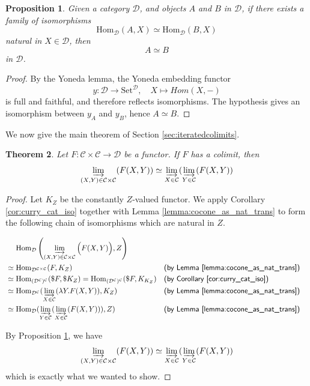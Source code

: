 \documentclass{msthesis}
\newtheorem{theorem}{Theorem}[section]
\newtheorem{prop}[theorem]{Proposition}
\theoremstyle{definition}
\newcommand{\mcC}{\mathcal{C}}
\newcommand{\mcD}{\mathcal{D}}
\newcommand{\Set}{\ensuremath{\mathrm{Set}}}
\newcommand{\colim}{\varinjlim}
\newcommand{\Hom}{\mathrm{Hom}}
\begin{document}
\begin{prop}\label{prop:yoneda_iso}
    Given a category $\mcD$, and objects $A$ and $B$ in $\mcD$, if there exists a family of isomorphisms
    \[ \Hom_\mcD(A, X) \simeq \Hom_\mcD(B, X) \]
    natural in $X \in \mcD$, then
    \[ A \simeq B\]
    in $\mcD$.
\end{prop}

\begin{proof}
    By the Yoneda lemma, the Yoneda embedding functor
    \[ y : \mcD \to \Set^\mcD,\quad X \mapsto Hom(X, -)\]
    is full and faithful, and therefore reflects isomorphisms.
    The hypothesis gives an isomorphism between $y_A$ and $y_B$, hence $A \simeq B$.
\end{proof}

We now give the main theorem of Section \ref{sec:iteratedcolimits}.

\begin{theorem}\label{thm:iterated_colimits}
    Let $F : \mcC \times \mcC \to \mcD$ be a functor. If $F$ has a colimit, then
    \[ \colim_{(X, Y) \in \mcC \times \mcC}(F(X, Y)) \simeq \colim_{X \in \mcC}(\colim_{Y \in \mcC}(F(X,Y)) \]
\end{theorem}
\begin{proof}
    Let $K_Z$ be the constantly $Z$-valued functor.  We apply Corollary \ref{cor:curry_cat_iso} together with Lemma \ref{lemma:cocone_as_nat_trans} to form the following chain of isomorphisms which are natural in $Z$.

    \begin{align*}
        &\phantom{\simeq}\;\; \Hom_{\mcD}\left(\colim_{(X,Y) \in \mcC \times \mcC}\Big(F(X,Y)
        \Big), Z\right) \\
        &\simeq \Hom_{\mcD^{\mcC \times \mcC}}(F, K_Z)  && \textsf{(by Lemma \ref{lemma:cocone_as_nat_trans})}\\
        &\simeq \Hom_{(\mcD^{\mcC})^\mcC}(\$F, \$K_Z) = 
        \Hom_{(\mcD^{\mcC})^\mcC}(\$F, K_{K_Z})   && \textsf{(by Corollary \ref{cor:curry_cat_iso})}\\
        &\simeq \Hom_{\mcD^\mcC}(\colim_{X \in \mcC}(\lambda Y. F(X, Y)), K_Z)   && \textsf{(by Lemma \ref{lemma:cocone_as_nat_trans})}\\
        &\simeq \Hom_\mcD(\colim_{Y \in \mcC}(\colim_{X \in \mcC}(F(X, Y))), Z)   && \textsf{(by Lemma \ref{lemma:cocone_as_nat_trans})}
    \end{align*}

    By Proposition \ref{prop:yoneda_iso}, we have
    \[ \colim_{(X, Y) \in \mcC \times \mcC}(F(X, Y)) \simeq \colim_{X \in \mcC}(\colim_{Y \in \mcC}(F(X,Y)) \]
    which is exactly what we wanted to show.
\end{proof}
\end{document}
